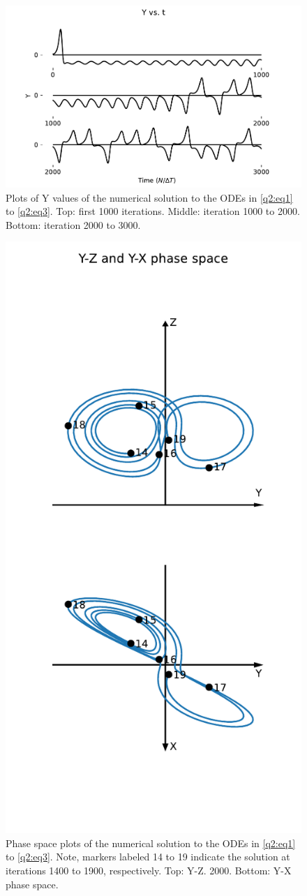 \documentclass[a4paper,11pt]{article}
\theoremstyle{plain}
\theoremstyle{definition}
\theoremstyle{remark}
\begin{document}
\begin{figure}[H]
    \centering
    \includegraphics[width=\linewidth]{../plots/a3q2_y_vs_t.pdf}
    \caption{Plots of Y values of the
    numerical solution to the ODEs in \cref{q2:eq1} to \cref{q2:eq3}.
    Top: first 1000 iterations. Middle: iteration 1000 to
    2000. Bottom: iteration 2000 to 3000.}
    \label{q2:1}
\end{figure}

\begin{figure}[H]
    \centering
    \includegraphics[width=0.6\linewidth]{../plots/a3q2_phase.pdf}
    \caption{Phase space plots of the
    numerical solution to the ODEs in \cref{q2:eq1} to \cref{q2:eq3}.
    Note, markers labeled
    14 to 19 indicate the solution at
    iterations 1400 to 1900, respectively. Top: Y-Z.
    2000. Bottom: Y-X phase space.}
    \label{q2:2}
\end{figure}
\end{document}
